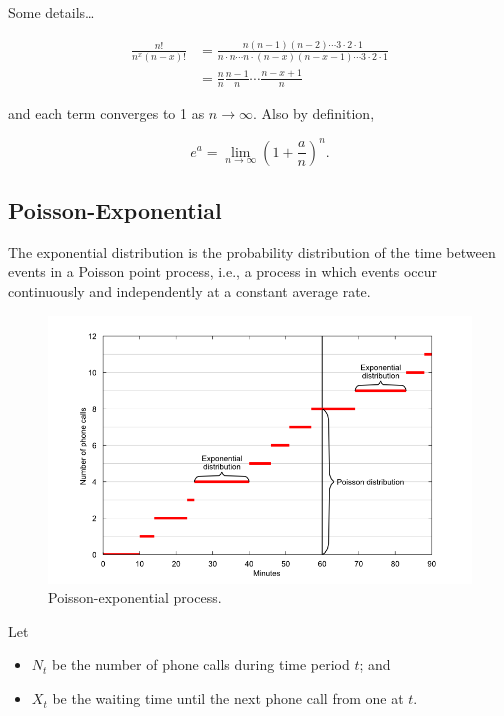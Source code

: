 \documentclass[
]{book}
\providecommand{\tightlist}{%
  \setlength{\itemsep}{0pt}\setlength{\parskip}{0pt}}
\theoremstyle{definition}
\theoremstyle{definition}
\theoremstyle{definition}
\theoremstyle{definition}
\theoremstyle{remark}
\begin{document}
Some details\ldots{}

\begin{align*}
\frac{n!}{n^x(n-x)!}
&= \frac{n(n-1)(n-2)\cdots 3\cdot 2 \cdot 1}{n \cdot n \cdots n \cdot (n-x)(n-x-1)\cdots 3\cdot 2 \cdot 1} \\
&= \frac{n}{n}\frac{n-1}{n} \cdots \frac{n-x+1}{n}
\end{align*}

and each term converges to 1 as \(n\to\infty\).
Also by definition,

\[
e^a = \lim_{n\to\infty }\left(1 + \frac{a}{n} \right)^n.
\]

\hypertarget{poisson-exponential}{%
\subsection{Poisson-Exponential}\label{poisson-exponential}}

The exponential distribution is the probability distribution of the time between events in a Poisson point process, i.e., a process in which events occur continuously and independently at a constant average rate.

\begin{figure}

{\centering \includegraphics[width=0.9\linewidth]{figure/exp_poisson_process} 

}

\caption{Poisson-exponential process.}\label{fig:exppoissonprocess}
\end{figure}

Let

\begin{itemize}
\tightlist
\item
  \(N_t\) be the number of phone calls during time period \(t\); and
\item
  \(X_t\) be the waiting time until the next phone call from one at \(t\).
\end{itemize}
\end{document}
